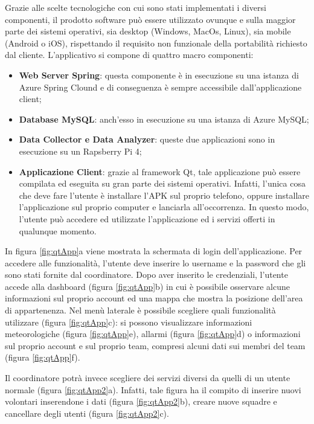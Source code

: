 
Grazie alle scelte tecnologiche con cui sono stati implementati i diversi componenti, il prodotto software può essere utilizzato ovunque e sulla maggior parte dei sistemi operativi, sia desktop (Windows, MacOs, Linux), sia mobile (Android o iOS), rispettando il requisito non funzionale della portabilità richiesto dal cliente.
L'applicativo si compone di quattro macro componenti:
\begin{itemize}
	\item \textbf{Web Server Spring}: questa componente è in esecuzione su una istanza di Azure Spring Clound e di conseguenza è sempre accessibile dall'applicazione client;
	\item \textbf{Database MySQL}: anch'esso in esecuzione su una istanza di Azure MySQL;
	\item \textbf{Data Collector e Data Analyzer}: queste due applicazioni sono in esecuzione su un Rapsberry Pi 4;
	\item \textbf{Applicazione Client}: grazie al framework Qt, tale applicazione può essere compilata ed eseguita su gran parte dei sistemi operativi. Infatti, l'unica cosa che deve fare l'utente è installare l'APK sul proprio telefono, oppure installare l'applicazione sul proprio computer e lanciarla all'occorrenza. In questo modo, l'utente può accedere ed utilizzate l'applicazione ed i servizi offerti in qualunque momento. 
\end{itemize}

In figura \ref{fig:qtApp}a viene mostrata la schermata di login dell'applicazione. Per accedere alle funzionalità, l'utente deve inserire lo username e la password che gli sono stati fornite dal coordinatore. 
Dopo aver inserito le credenziali, l'utente accede alla dashboard (figura \ref{fig:qtApp}b) in cui è possibile osservare alcune informazioni sul proprio account ed una mappa che mostra la posizione dell'area di appartenenza.
Nel menù laterale è possibile scegliere quali funzionalità utilizzare (figura \ref{fig:qtApp}c): si possono visualizzare informazioni meteorologiche (figura \ref{fig:qtApp}e), allarmi (figura \ref{fig:qtApp}d) o informazioni sul proprio account e sul proprio team, compresi alcuni dati sui membri del team (figura \ref{fig:qtApp}f).

Il coordinatore potrà invece scegliere dei servizi diversi da quelli di un utente normale (figura \ref{fig:qtApp2}a). Infatti, tale figura ha il compito di inserire nuovi volontari inserendone i dati (figura \ref{fig:qtApp2}b), creare nuove squadre e cancellare degli utenti (figura \ref{fig:qtApp2}c).

